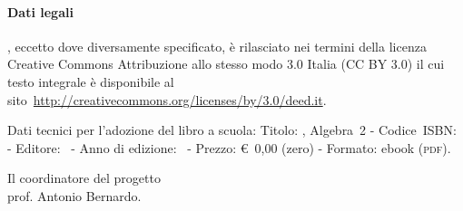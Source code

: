 \paragraph{Dati legali} \serie, eccetto dove diversamente specificato, è rilasciato nei termini 
della licenza Creative Commons Attribuzione allo stesso modo 3.0 Italia
(CC BY 3.0) il cui testo integrale è disponibile al 
sito~\url{http://creativecommons.org/licenses/by/3.0/deed.it}.

Dati tecnici per l'adozione del libro a scuola: Titolo: \serie, Algebra~2 - Codice~ISBN:
{\mcisbn} - Editore: \editore\ - Anno di edizione: \anno\ - Prezzo: €~0,00 (zero) - Formato:
ebook ({\scshape{pdf}}).

\begin{flushright}
Il coordinatore del progetto\\
prof. Antonio Bernardo.
\end{flushright}

\cleardoublepage
